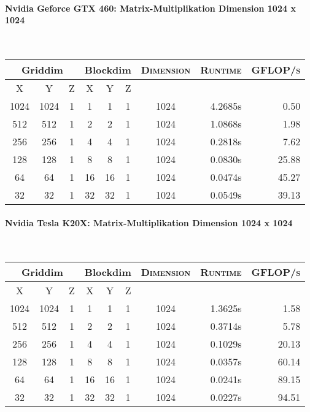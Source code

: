 \paragraph{Nvidia Geforce GTX 460: Matrix-Multiplikation Dimension 1024 x 1024}\hfill\\
\begin{tabular}{|c|c|c||c|c|c||c|r|r|}
	\hline
	\multicolumn{3}{|c||}{Griddim} & \multicolumn{3}{|c||}{Blockdim} & \textsc{Dimension} & \textsc{Runtime} & \textsc{GFLOP/s} \\
	\hline
	\textsc{X} & \textsc{Y} & \textsc{Z} & \textsc{X} & \textsc{Y} & \textsc{Z} & & & \\
	\hline
	\hline
	1024 & 1024 & 1 & 1 & 1 & 1 & 1024 & 4.2685s  & 0.50 \\ 
	\hline 
	512 & 512 & 1 & 2 & 2 & 1 & 1024 & 1.0868s  & 1.98 \\ 
	\hline 
	256 & 256 & 1 & 4 & 4 & 1 & 1024 & 0.2818s  & 7.62 \\ 
	\hline 
	128 & 128 & 1 & 8 & 8 & 1 & 1024 & 0.0830s  & 25.88 \\ 
	\hline 
	64 & 64 & 1 & 16 & 16 & 1 & 1024 & 0.0474s  & 45.27 \\ 
	\hline 
	32 & 32 & 1 & 32 & 32 & 1 & 1024 & 0.0549s  & 39.13 \\ 
	\hline 
	
\end{tabular}


\paragraph{Nvidia Tesla K20X: Matrix-Multiplikation Dimension 1024 x 1024}\hfill\\
\begin{tabular}{|c|c|c||c|c|c||c|r|r|}
	\hline
	\multicolumn{3}{|c||}{Griddim} & \multicolumn{3}{|c||}{Blockdim} & \textsc{Dimension} & \textsc{Runtime} & \textsc{GFLOP/s} \\
	\hline
	\textsc{X} & \textsc{Y} & \textsc{Z} & \textsc{X} & \textsc{Y} & \textsc{Z} & & & \\
	\hline
	\hline
	1024 & 1024 & 1 & 1 & 1 & 1 & 1024 & 1.3625s  & 1.58 \\ 
	\hline 
	512 & 512 & 1 & 2 & 2 & 1 & 1024 & 0.3714s  & 5.78 \\ 
	\hline 
	256 & 256 & 1 & 4 & 4 & 1 & 1024 & 0.1029s  & 20.13 \\ 
	\hline 
	128 & 128 & 1 & 8 & 8 & 1 & 1024 & 0.0357s  & 60.14 \\ 
	\hline 
	64 & 64 & 1 & 16 & 16 & 1 & 1024 & 0.0241s  & 89.15 \\ 
	\hline 
	32 & 32 & 1 & 32 & 32 & 1 & 1024 & 0.0227s  & 94.51 \\ 
	\hline 

\end{tabular}

